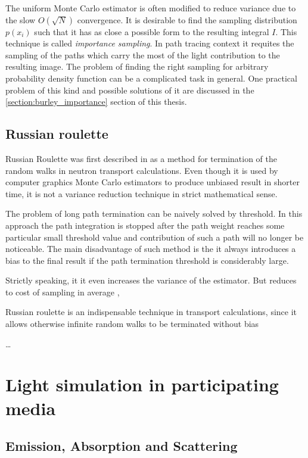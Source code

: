 The uniform Monte Carlo estimator is often modified to reduce variance due to the slow $O(\sqrt{N})$
convergence. It is desirable to find the sampling distribution $p(x_i)$ such that it has as close a
possible form to the resulting integral $I$. This technique is called \emph{importance sampling}. In
path tracing context it requites the sampling of the paths which carry the most of the light
contribution to the resulting image. The problem of finding the right sampling for arbitrary
probability density function can be a complicated task in general. One practical problem of this
kind and possible solutions of it are discussed in the \ref{section:burley_importance} section of
this thesis.



\subsection{Russian roulette}
\label{subsection:rr}
Russian Roulette was first described in \cite{hammersley64} as a method for termination of the
random walks in neutron transport calculations. Even though it is used by computer graphics Monte
Carlo estimators to produce unbiased result in shorter time, it is not a variance reduction
technique in strict mathematical sense.

The problem of long path termination can be naively solved by threshold. In this approach the
path integration is stopped after the path weight reaches some particular small threshold value and
contribution of such a path will no longer be noticeable. The main disadvantage of such method is
the it always introduces a bias to the final result if the path termination threshold is
considerably large.

Strictly speaking, it it even increases the variance of the estimator. But reduces to cost of sampling in
average \cite{Veach:1998:RMC:927297}, \cite{Csi03variancereduction}

Russian roulette is an indispensable technique in transport calculations, since it allows otherwise
infinite random walks to be terminated without bias \cite{Veach:1998:RMC:927297}

\ldots

\section{Light simulation in participating media}
\label{section:light_simulation_theory}
\subsection{Emission, Absorption and Scattering}

